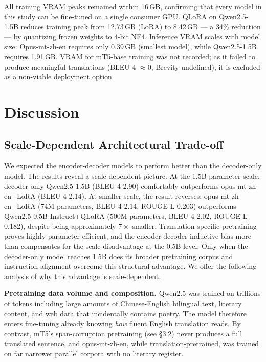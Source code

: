 All training VRAM peaks remained within 16\,GB, confirming that every model in this study can be fine-tuned on a single consumer GPU. QLoRA on Qwen2.5-1.5B reduces training peak from 12.73\,GB (LoRA) to 8.42\,GB --- a 34\% reduction --- by quantizing frozen weights to 4-bit NF4. Inference VRAM scales with model size: Opus-mt-zh-en requires only 0.39\,GB (smallest model), while Qwen2.5-1.5B requires 1.91\,GB. VRAM for mT5-base training was not recorded; as it failed to produce meaningful translations (BLEU-4 $\approx 0$, Brevity undefined), it is excluded as a non-viable deployment option.

\section{Discussion}\label{sec:discussion}

\subsection{Scale-Dependent Architectural Trade-off}

We expected the encoder-decoder models to perform better than the decoder-only model. The results reveal a scale-dependent picture. At the 1.5B-parameter scale, decoder-only Qwen2.5-1.5B (BLEU-4 2.90) comfortably outperforms opus-mt-zh-en+LoRA (BLEU-4 2.14). At smaller scale, the result reverses: opus-mt-zh-en+LoRA (74M parameters, BLEU-4 2.14, ROUGE-L 0.203) outperforms Qwen2.5-0.5B-Instruct+QLoRA (500M parameters, BLEU-4 2.02, ROUGE-L 0.182), despite being approximately $7\times$ smaller. Translation-specific pretraining proves highly parameter-efficient, and the encoder-decoder inductive bias more than compensates for the scale disadvantage at the 0.5B level. Only when the decoder-only model reaches 1.5B does its broader pretraining corpus and instruction alignment overcome this structural advantage. We offer the following analysis of why this advantage is scale-dependent.

    \textbf{Pretraining data volume and composition.} Qwen2.5 was trained on trillions of tokens including large amounts of Chinese-English bilingual text, literary content, and web data that incidentally contains poetry. The model therefore enters fine-tuning already knowing \emph{how} fluent English translation reads. By contrast, mT5's span-corruption pretraining (see \S3.2) never produces a full translated sentence, and opus-mt-zh-en, while translation-pretrained, was trained on far narrower parallel corpora with no literary register.

